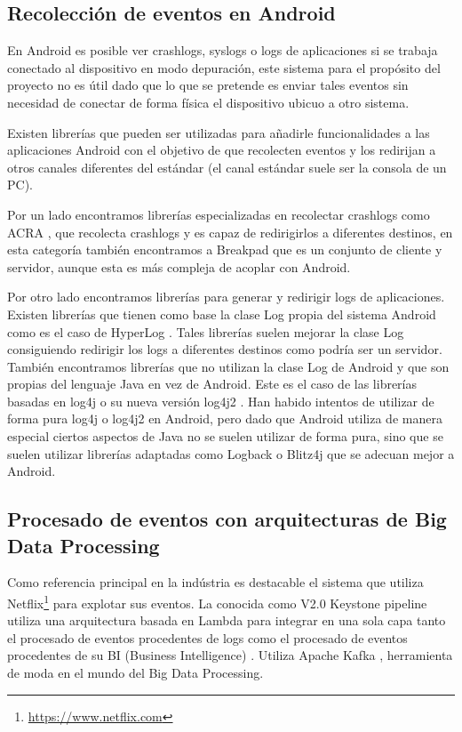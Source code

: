 \subsection{Recolección de eventos en Android}
En Android es posible ver crashlogs, syslogs o logs de aplicaciones si se trabaja conectado al dispositivo en modo depuración, este sistema para el propósito del proyecto no es útil dado que lo que se pretende es enviar tales eventos sin necesidad de conectar de forma física el dispositivo ubicuo a otro sistema. 

Existen librerías que pueden ser utilizadas para añadirle funcionalidades a las aplicaciones Android con el objetivo de que recolecten eventos y los redirijan a otros canales diferentes del estándar (el canal estándar suele ser la consola de un PC). 

Por un lado encontramos librerías especializadas en recolectar crashlogs como ACRA \cite{Tfg:acra}, que recolecta crashlogs y es capaz de redirigirlos a diferentes destinos, en esta categoría también encontramos a Breakpad \cite{Tfg:breakpad} que es un conjunto de cliente y servidor, aunque esta es más compleja de acoplar con Android.

Por otro lado encontramos librerías para generar y redirigir logs de aplicaciones. Existen librerías que tienen como base la clase Log \cite{Tfg:logclass} propia del sistema Android como es el caso de HyperLog \cite{Tfg:hyperlog}. Tales librerías suelen mejorar la clase Log consiguiendo redirigir los logs a diferentes destinos como podría ser un servidor. También encontramos librerías que no utilizan la clase Log de Android y que son propias del lenguaje Java en vez de Android. Este es el caso de las librerías basadas en log4j o su nueva versión log4j2 \cite{Tfg:log4j2}. Han habido intentos de utilizar de forma pura log4j o log4j2 en Android, pero dado que Android utiliza de manera especial ciertos aspectos de Java no se suelen utilizar de forma pura, sino que se suelen utilizar librerías adaptadas como Logback \cite{Tfg:logback} o Blitz4j \cite{Tfg:blitz4j} que se adecuan mejor a Android.

\subsection{Procesado de eventos con arquitecturas de Big Data Processing}\label{cap:procesadoBigData}
Como referencia principal en la indústria es destacable el sistema que utiliza Netflix\footnote{\href{https://www.netflix.com}{https://www.netflix.com}} para explotar sus eventos. La conocida como V2.0 Keystone pipeline \cite{Tfg:netflixpipe} utiliza una arquitectura basada en Lambda para integrar en una sola capa tanto el procesado de eventos procedentes de logs como el procesado de eventos procedentes de su BI (Business Intelligence) \cite{Tfg:bi}. Utiliza Apache Kafka \cite{Tfg:kafka}, herramienta de moda en el mundo del Big Data Processing.

